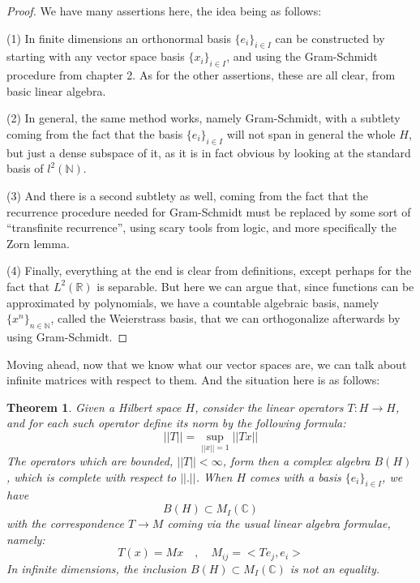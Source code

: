 \documentclass[12pt]{amsbook}
\newtheorem{theorem}{Theorem}[chapter]
\begin{document}
\begin{proof}
We have many assertions here, the idea being as follows:

\medskip

(1) In finite dimensions an orthonormal basis $\{e_i\}_{i\in I}$ can be constructed by starting with any vector space basis $\{x_i\}_{i\in I}$, and using the Gram-Schmidt procedure from chapter 2. As for the other assertions, these are all clear, from basic linear algebra.

\medskip

(2) In general, the same method works, namely Gram-Schmidt, with a subtlety coming from the fact that the basis $\{e_i\}_{i\in I}$ will not span in general the whole $H$, but just a dense subspace of it, as it is in fact obvious by looking at the standard basis of $l^2(\mathbb N)$. 

\medskip

(3) And there is a second subtlety as well, coming from the fact that the recurrence procedure needed for Gram-Schmidt must be replaced by some sort of ``transfinite recurrence'', using scary tools from logic, and more specifically the Zorn lemma.

\medskip

(4) Finally, everything at the end is clear from definitions, except perhaps for the fact that $L^2(\mathbb R)$ is separable. But here we can argue that, since functions can be approximated by polynomials, we have a countable algebraic basis, namely $\{x^n\}_{n\in\mathbb N}$, called the Weierstrass basis, that we can orthogonalize afterwards by using Gram-Schmidt.
\end{proof}

Moving ahead, now that we know what our vector spaces are, we can talk about infinite matrices with respect to them. And the situation here is as follows:


\begin{theorem}
Given a Hilbert space $H$, consider the linear operators $T:H\to H$, and for each such operator define its norm by the following formula:
$$||T||=\sup_{||x||=1}||Tx||$$
The operators which are bounded, $||T||<\infty$, form then a complex algebra $B(H)$, which is complete with respect to $||.||$. When $H$ comes with a basis $\{e_i\}_{i\in I}$, we have
$$B(H)\subset M_I(\mathbb C)$$
with the correspondence $T\to M$ coming via the usual linear algebra formulae, namely:
$$T(x)=Mx\quad,\quad M_{ij}=<Te_j,e_i>$$
In infinite dimensions, the inclusion $B(H)\subset M_I(\mathbb C)$ is not an equality.
\end{theorem}
\end{document}
